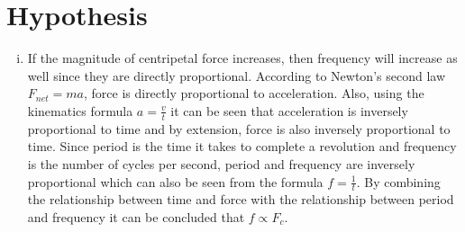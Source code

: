 \documentclass{article}[12pt]
\begin{document}
\section*{Hypothesis}
\begin{enumerate}[i.]
\item 
If the magnitude of centripetal force increases, then frequency will increase as well since they are directly proportional. According to Newton's second law $F_{net}=ma$, force is directly proportional to acceleration. Also, using the kinematics formula $a=\frac{v}{t}$ it can be seen that acceleration is inversely proportional to time and by extension, force is also inversely proportional to time. Since period is the time it takes to complete a revolution and frequency is the number of cycles per second, period and frequency are inversely proportional which can also be seen from the formula $f=\frac{1}{t}$. By combining the relationship between time and force with the relationship between period and frequency it can be concluded that $f\propto F_c$.\\\\
\begin{tikzpicture}


\end{tikzpicture}
\end{enumerate}
\end{document}
